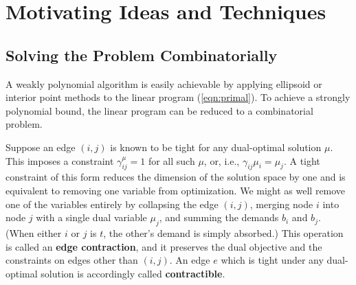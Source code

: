 \documentclass[11pt]{article}
\let\comment\todo
\newcommand{\question}[1]{\comment[nolist,color=red!40]{#1}}
\theoremstyle{definition}
\theoremstyle{definition}
\theoremstyle{definition}
\newcommand{\gij}{\gamma_{ij}}
\newcommand{\giij}{\gamma_{ij}^{\mu}}
\renewcommand{\todo}[1]{\hl{TODO: #1}}
\begin{document}
\section{Motivating Ideas and Techniques}
\label{sec:motivate}
	\subsection{Solving the Problem Combinatorially}
	\label{sec:motivate-dual}
	
	A weakly polynomial algorithm is easily achievable by applying ellipsoid or
	interior point methods to the linear program
	(\ref{eqn:primal}).
	To achieve a strongly polynomial
	bound, the linear program can be reduced to a combinatorial problem.
	
	Suppose an edge $(i, j)$ is known to be tight for any dual-optimal solution $\mu$. This
    imposes a constraint $\giij = 1$ for all such $\mu$, or, i.e., $\gij \mu_i = \mu_j$.
    A tight constraint of this form reduces the dimension of the solution
    space by one and is equivalent to removing one variable from optimization.
    We might as well remove one of the variables entirely by collapsing the edge $(i, j)$,
    merging node $i$ into node $j$ with a single dual variable $\mu_j$, and summing the
    demands $b_i$ and $b_j$. (When either $i$ or $j$ is $t$, the other's demand is simply absorbed.)
    This operation is called an \textbf{edge contraction},
    and it preserves the dual objective and the constraints on edges other than $(i, j)$.
    An edge $e$ which is tight under any dual-optimal solution is accordingly
    called \textbf{contractible}.
    
%
\end{document}
